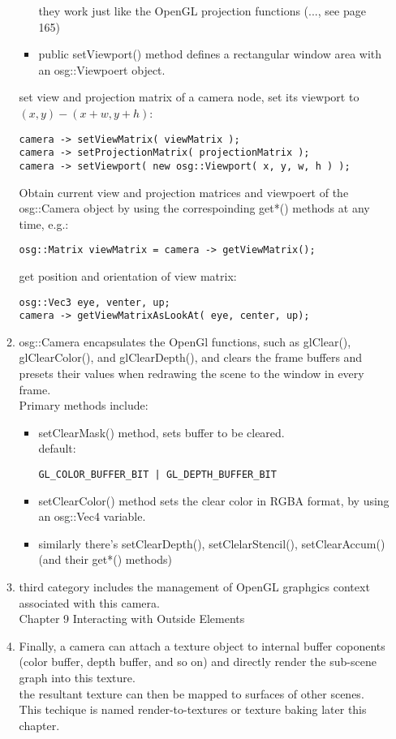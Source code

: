 \documentclass[a4paper,12pt]{book}
\begin{document}
\begin{itemize}
\begin{enumerate}
\begin{itemize}
they work just like the OpenGL projection functions (..., see page 165)
\item public setViewport() method defines a rectangular window area with an osg::Viewpoert object.
\end{itemize}
set view and projection matrix of a camera node, set its viewport to $(x,y) - (x+w, y+h)$:
\begin{lstlisting}
camera -> setViewMatrix( viewMatrix );
camera -> setProjectionMatrix( projectionMatrix );
camera -> setViewport( new osg::Viewport( x, y, w, h ) );
\end{lstlisting}
Obtain current view and projection matrices and viewpoert of the osg::Camera object by using the correspoinding get*() methods at any time, e.g.:
\begin{lstlisting}
osg::Matrix viewMatrix = camera -> getViewMatrix();
\end{lstlisting}
get position and orientation of view matrix:
\begin{lstlisting}
osg::Vec3 eye, venter, up;
camera -> getViewMatrixAsLookAt( eye, center, up);
\end{lstlisting}
\item osg::Camera encapsulates the OpenGl functions, such as glClear(), glClearColor(), and glClearDepth(), and clears the frame buffers and presets their values when redrawing the scene to the window in every frame.\\
Primary methods include:
\begin{itemize}
\item setClearMask() method, sets buffer to be cleared.\\default:
\begin{lstlisting}
GL_COLOR_BUFFER_BIT | GL_DEPTH_BUFFER_BIT
\end{lstlisting}

\item setClearColor() method sets the clear color in RGBA format, by using an osg::Vec4 variable.

\item similarly there's setClearDepth(), setClelarStencil(), setClearAccum() (and their get*() methods)
\end{itemize}

\item third category includes the management of OpenGL graphgics context associated with this camera.\\
\textrightarrow Chapter 9 Interacting with Outside Elements

\item Finally, a camera can attach a texture object to internal buffer coponents (color buffer, depth buffer, and so on) and directly render the sub-scene graph into this texture.\\
\textrightarrow the resultant texture can then be mapped to surfaces of other scenes. This techique is named render-to-textures or texture baking \textrightarrow later this chapter.

\end{enumerate}

\end{itemize}
\end{document}
